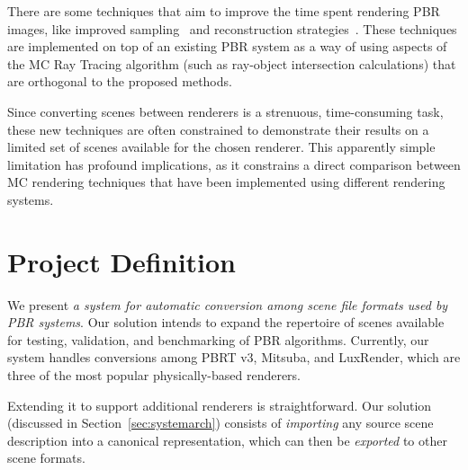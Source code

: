 There are some techniques that aim to improve the time spent rendering PBR images, like improved sampling~\cite{Heck2013, Pilleboue:2015} and reconstruction strategies~\cite{Sen2012, Rousselle2013, Kalantari2015, Bitterli2016}. These techniques are implemented on top of an existing PBR system as a way of using aspects of the MC Ray Tracing algorithm (such as ray-object intersection calculations) that are orthogonal to the proposed methods.

Since converting scenes between renderers is a strenuous, time-consuming task, these new techniques are often constrained to demonstrate their results on a limited set of scenes available for the chosen renderer. This apparently simple limitation has profound implications, as it constrains a direct comparison between MC rendering techniques that have been implemented using different rendering systems.

\section{Project Definition}	

We present {\it a system for automatic conversion among scene file formats used by PBR systems}. Our solution intends to expand the repertoire of scenes available for testing, validation, and benchmarking of PBR algorithms. Currently, our system handles conversions among PBRT v3, Mitsuba, and LuxRender, which are three of the most popular physically-based renderers. 

Extending it to support additional renderers is straightforward. Our solution (discussed in Section~\ref{sec:systemarch}) consists of {\it importing} any source scene description into a canonical representation, which can then be {\it exported} to 
other scene formats. 

